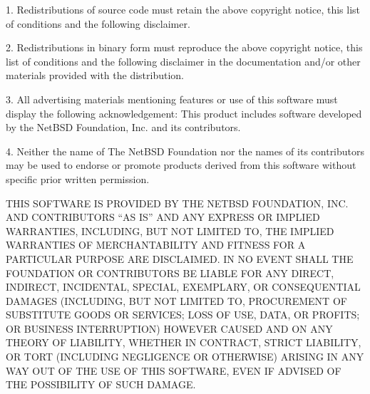 \documentclass[twoside]{tceusermanual}
\begin{document}
   1. Redistributions of source code must retain the above copyright
      notice, this list of conditions and the following disclaimer.

   2. Redistributions in binary form must reproduce the above copyright
      notice, this list of conditions and the following disclaimer in the
      documentation and/or other materials provided with the distribution.

   3. All advertising materials mentioning features or use of this software
      must display the following acknowledgement:
        This product includes software developed by the NetBSD
        Foundation, Inc. and its contributors.

   4. Neither the name of The NetBSD Foundation nor the names of its
      contributors may be used to endorse or promote products derived
      from this software without specific prior written permission.
  
   THIS SOFTWARE IS PROVIDED BY THE NETBSD FOUNDATION, INC. AND CONTRIBUTORS
   ``AS IS'' AND ANY EXPRESS OR IMPLIED WARRANTIES, INCLUDING, BUT NOT LIMITED
   TO, THE IMPLIED WARRANTIES OF MERCHANTABILITY AND FITNESS FOR A PARTICULAR
   PURPOSE ARE DISCLAIMED.  IN NO EVENT SHALL THE FOUNDATION OR CONTRIBUTORS
   BE LIABLE FOR ANY DIRECT, INDIRECT, INCIDENTAL, SPECIAL, EXEMPLARY, OR
   CONSEQUENTIAL DAMAGES (INCLUDING, BUT NOT LIMITED TO, PROCUREMENT OF
   SUBSTITUTE GOODS OR SERVICES; LOSS OF USE, DATA, OR PROFITS; OR BUSINESS
   INTERRUPTION) HOWEVER CAUSED AND ON ANY THEORY OF LIABILITY, WHETHER IN
   CONTRACT, STRICT LIABILITY, OR TORT (INCLUDING NEGLIGENCE OR OTHERWISE)
   ARISING IN ANY WAY OUT OF THE USE OF THIS SOFTWARE, EVEN IF ADVISED OF THE
   POSSIBILITY OF SUCH DAMAGE.


\cleardoublepage

\end{document}
